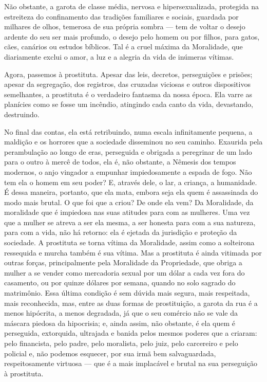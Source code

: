 Não obstante, a garota de classe média, nervosa e hipersexualizada,
protegida na estreiteza do confinamento das tradições familiares e
sociais, guardada por milhares de olhos, temerosa de sua própria sombra
--- tem de voltar o desejo ardente do seu ser mais profundo, o desejo pelo
homem ou por filhos, para gatos, cães, canários ou estudos
bíblicos. Tal é a cruel máxima da Moralidade, que diariamente exclui o
amor, a luz e a alegria da vida de inúmeras vítimas.

Agora, passemos à prostituta. Apesar das leis, decretos, perseguições e
prisões; apesar da segregação, dos registros, das cruzadas viciosas e
outros dispositivos semelhantes, a prostituta é o verdadeiro fantasma da
nossa época. Ela varre as planícies como se fosse um incêndio, atingindo
cada canto da vida, devastando, destruindo.

No final das contas, ela está retribuindo, numa escala infinitamente pequena,
a maldição e os horrores que a sociedade disseminou no seu caminho.
Exaurida pela perambulação ao longo de eras, perseguida e obrigada a
peregrinar de um lado para o outro à mercê de todos, ela é, não
obstante, a Nêmesis dos tempos modernos, o anjo vingador a empunhar
impiedosamente a espada de fogo. Não tem ela o homem em seu poder? E,
através dele, o lar, a criança, a humanidade. É dessa maneira, portanto,
que ela mata, embora seja ela quem é assassinada do modo mais brutal. O
que foi que a criou? De onde ela vem? Da Moralidade, da moralidade que é
impiedosa nas suas atitudes para com as mulheres. Uma vez que a mulher
se atreva a ser ela mesma, a ser honesta para com a sua natureza, para
com a vida, não há retorno: ela é ejetada da jurisdição e proteção da
sociedade. A prostituta se torna vítima da Moralidade, assim como a
solteirona ressequida e murcha também é sua vítima. Mas a prostituta é
ainda vitimada por outras forças, principalmente pela Moralidade da
Propriedade, que obriga a mulher a se vender como mercadoria sexual por
um dólar a cada vez fora do casamento, ou por quinze dólares por
semana, quando no solo sagrado do matrimônio. Essa última condição é sem
dúvida mais segura, mais respeitada, mais reconhecida, mas, entre as
duas formas de prostituição, a garota da rua é a menos hipócrita, a
menos degradada, já que o seu comércio não se vale da máscara piedosa da
hipocrisia; e, ainda assim, não obstante, é ela quem é perseguida,
extorquida, ultrajada e banida pelos mesmos poderes que a criaram: pelo
financista, pelo padre, pelo moralista, pelo juiz, pelo carcereiro e
pelo policial e, não podemos esquecer, por sua irmã bem salvaguardada,
respeitosamente virtuosa --- que é a mais implacável e brutal na sua
perseguição à prostituta.

